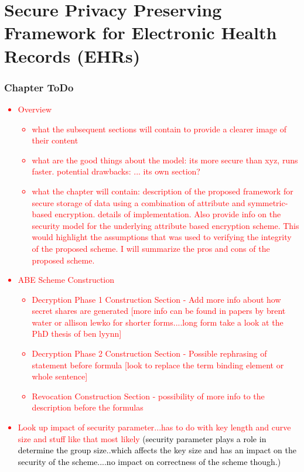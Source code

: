 \chapter{Secure Privacy Preserving Framework for Electronic Health Records (EHRs)}
\label{chap:proposed_solution}


\renewcommand{\theenumi}{\Alph{enumi}}
\renewcommand{\theenumii}{\roman{enumii}}


\subsection*{Chapter ToDo}
\textcolor{red}{
\begin{itemize}
	\item Overview	
	\begin{itemize}
		\item what the subsequent sections will contain to provide a clearer image of their content
		\item what are the good things about the model: its more secure than xyz, runs faster. potential drawbacks: ... its own section?
		\item what the chapter will contain: description of the proposed framework for secure storage of data using a combination of attribute and symmetric-based encryption.  details of implementation. Also provide info on the security model for the underlying attribute based encryption scheme. This would highlight the assumptions that was used to verifying the integrity of the proposed scheme. I will summarize the pros and cons of the proposed scheme.
	\end{itemize}
	\item ABE Scheme Construction
	\begin{itemize}
		\item Decryption Phase 1 Construction Section - Add more info about how secret shares are generated [more info can be found in papers by brent water or allison lewko for shorter forms....long form take a look at the PhD thesis of ben lyynn]
		\item Decryption Phase 2 Construction Section - Possible rephrasing of statement before formula [look to replace the term binding element or whole sentence]
		\item Revocation Construction Section - possibility of more info to the description before the formulas
	\end{itemize}
	\item Look up impact of security parameter...has to do with key length and curve size and stuff like that most likely \textcolor{black}{(security parameter plays a role in determine the group size..which affects the key size and has an impact on the security of the scheme....no impact on correctness of the scheme though.)}

\end{itemize}}
